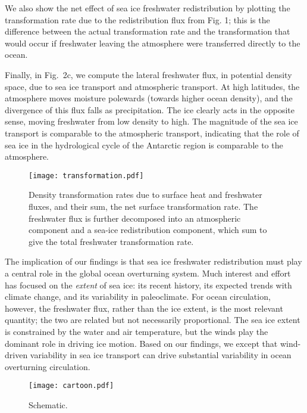 \documentclass{naturemod}
\begin{document}
 We also show the net effect of sea ice freshwater redistribution by plotting the transformation rate due to the redistribution flux from Fig. 1; this is the difference between the actual transformation rate and the transformation that would occur if freshwater leaving the atmosphere were transferred directly to the ocean.

Finally, in Fig.~2c, we compute the lateral freshwater flux, in potential density space, due to sea ice transport and atmospheric transport. At high latitudes, the atmosphere moves moisture polewards (towards higher ocean density), and the divergence of this flux falls as precipitation. The ice clearly acts in the opposite sense, moving freshwater from low density to high. The magnitude of the sea ice transport is comparable to the atmospheric transport, indicating that the role of sea ice in the hydrological cycle of the Antarctic region is comparable to the atmosphere.

\begin{figure}
\begin{center}
\texttt{[image: transformation.pdf]}
\caption{Density transformation rates due to surface heat and freshwater fluxes, and their sum, the net surface transformation rate. The freshwater flux is further decomposed into an atmospheric component and a sea-ice redistribution component, which sum to give the total freshwater transformation rate.}
\label{fig:transformation}
\end{center}
\end{figure}

The implication of our findings is that sea ice freshwater redistribution must play a central role in the global ocean overturning system. Much interest and effort has focused on the {\em extent} of sea ice: its recent history\cite{some}, its expected trends with climate change\cite{relevant}, and its variability in paleoclimate\cite{FerrariEtAl2014}. For ocean circulation, however, the freshwater flux, rather than the ice extent, is the most relevant quantity; the two are related but not necessarily proportional. The sea ice extent is constrained by the water and air temperature, but the winds play the dominant role in driving ice motion\cite{HollandKwok2012,HollandEtAl2014}. Based on our findings, we except that wind-driven variability in sea ice transport can drive substantial variability in ocean overturning circulation. 

\begin{figure}
\begin{center}
\texttt{[image: cartoon.pdf]}
\caption{Schematic.}
\label{fig:cartoon}
\end{center}
\end{figure}
\end{document}
